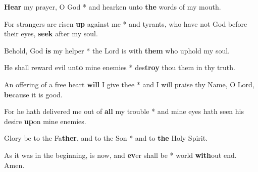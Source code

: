 \begin{multicols}{2}
	\textbf{Hear} my prayer, O God * and hearken unto \textbf{the} words of my mouth.
	
	For strangers are risen \textbf{up} against me * and tyrants, who have not God before their eyes, \textbf{seek} after my soul.
	
	Behold, God \textbf{is} my helper * the Lord is with \textbf{them} who uphold my soul.
	
	He shall reward evil un\textbf{to} mine enemies * des\textbf{troy} thou them in thy truth.
	
	An offering of a free heart \textbf{will} I give thee * and I will praise thy Name, O Lord, \textbf{be}cause it is good.
	
	For he hath delivered me out of \textbf{all} my trouble * and mine eyes hath seen his desire \textbf{up}on mine enemies.
	
	Glory be to the Fa\textbf{ther}, and to the Son * and to \textbf{the} Holy Spirit.
	
	As it was in the beginning, is now, and \textbf{ev}er shall be * world \textbf{with}out end. Amen.
\end{multicols}